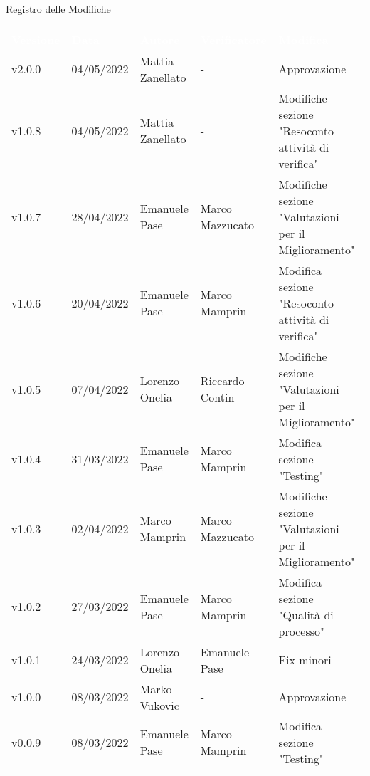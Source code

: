 \begin{center}
  \huge{Registro delle Modifiche}
\end{center}
\renewcommand\arraystretch{1,5}
{\centering
\begin{longtable}{|C{1.8cm}|C{2.1cm}|C{2cm}|C{2.4cm}|L{4.4cm}|}
  \hline
  \textcolor[HTML]{FFFFFF}{\textbf{Versione}} & \textcolor[HTML]{FFFFFF}{\textbf{Data}} & \textcolor[HTML]{FFFFFF}{\textbf{Autore}}  & \textcolor[HTML]{FFFFFF}{\textbf{Verificatore}} & \textcolor[HTML]{FFFFFF}{\textbf{Modifica}}    \\ \hline
  v2.0.0        & 04/05/2022  & Mattia Zanellato  &   -     & Approvazione                 \\ \hline
  v1.0.8        & 04/05/2022    & Mattia Zanellato    &  -    & Modifiche sezione "Resoconto attività di verifica"            \\ \hline
  v1.0.7        & 28/04/2022    & Emanuele Pase    &  Marco Mazzucato    & Modifiche sezione "Valutazioni per il Miglioramento"            \\ \hline
  v1.0.6        & 20/04/2022  & Emanuele Pase  &   Marco Mamprin     & Modifica sezione "Resoconto attività di verifica"                  \\ \hline
  v1.0.5        & 07/04/2022    & Lorenzo Onelia    & Riccardo Contin   & Modifiche sezione "Valutazioni per il Miglioramento"            \\ \hline
  v1.0.4        & 31/03/2022    & Emanuele Pase  &  Marco Mamprin   & Modifica sezione "Testing"                  \\ \hline
  v1.0.3       & 02/04/2022    & Marco Mamprin  &   Marco Mazzucato   & Modifiche sezione "Valutazioni per il Miglioramento"                 \\ \hline
  v1.0.2       & 27/03/2022    & Emanuele Pase  & Marco Mamprin      & Modifica sezione "Qualità di processo"                   \\ \hline
  v1.0.1       & 24/03/2022    & Lorenzo Onelia  & Emanuele Pase    & Fix minori                  \\ \hline
  v1.0.0       & 08/03/2022   & Marko Vukovic & - & Approvazione     \\ \hline
  v0.0.9       & 08/03/2022    & Emanuele Pase  & Marco Mamprin         & Modifica sezione "Testing"                   \\ \hline

\end{longtable}}
